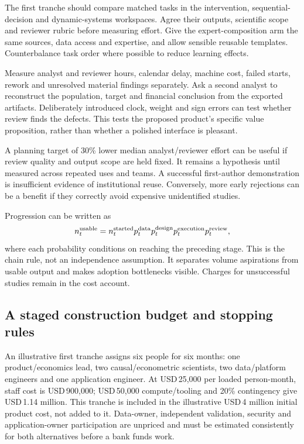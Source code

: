 The first tranche should compare matched tasks in the intervention,
sequential-decision and dynamic-systems workspaces. Agree their outputs,
scientific scope and reviewer rubric before measuring effort. Give the
expert-composition arm the same sources, data access and expertise, and
allow sensible reusable templates. Counterbalance task order where
possible to reduce learning effects.

Measure analyst and reviewer hours, calendar delay, machine cost,
failed starts, rework and unresolved material findings separately.
Ask a second analyst to reconstruct the population, target and financial
conclusion from the exported artifacts. Deliberately introduced clock,
weight and sign errors can test whether review finds the defects.
This tests the proposed product's specific value proposition, rather
than whether a polished interface is pleasant.

A planning target of 30\% lower median analyst/reviewer effort can be
useful if review quality and output scope are held fixed. It remains
a hypothesis until measured across repeated uses and teams. A successful
first-author demonstration is insufficient evidence of institutional
reuse. Conversely, more early rejections can be a benefit if they
correctly avoid expensive unidentified studies.

Progression can be written as
\[
 n_t^{\rm usable}=n_t^{\rm started}
 p_t^{\rm data}p_t^{\rm design}p_t^{\rm execution}p_t^{\rm review},
\]
where each probability conditions on reaching the preceding stage.
This is the chain rule, not an independence assumption. It separates
volume aspirations from usable output and makes adoption bottlenecks
visible. Charges for unsuccessful studies remain in the cost account.

\subsection{A staged construction budget and stopping rules}
\label{r3:investment-sequence}

An illustrative first tranche assigns six people for six months:
one product/economics lead, two causal/econometric scientists, two
data/platform engineers and one application engineer. At USD\,25,000
per loaded person-month, staff cost is USD\,900,000; USD\,50,000
compute/tooling and 20\% contingency give USD\,1.14 million.
This tranche is included in the illustrative USD\,4 million initial
product cost, not added to it. Data-owner, independent validation,
security and application-owner participation are unpriced and must
be estimated consistently for both alternatives before a bank funds work.

